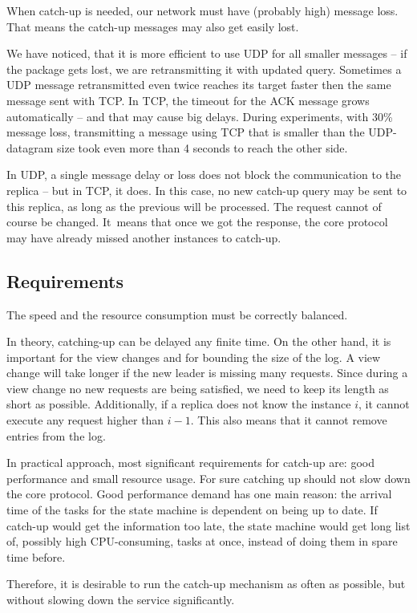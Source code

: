 When catch-up is needed, our network must have (probably high) message loss. That means the catch-up messages may also get easily lost.

We have noticed, that it is more efficient to use UDP for all smaller messages -- if the package gets lost, we are retransmitting it with updated query. Sometimes a UDP message retransmitted even twice reaches its target faster then the same message sent with TCP. In TCP, the timeout for the ACK message grows automatically -- and that may cause big delays. During experiments, with 30\% message loss, transmitting a message using TCP that is smaller than the UDP-datagram size took even more than 4 seconds to reach the other side.

In UDP, a single message delay or loss does not block the communication to the replica -- but in TCP, it does.
In this case, no new catch-up query may be sent to this replica, as long as the previous will be processed. The request cannot of course be changed. It~means that once we got the response, the core protocol may have already missed another instances to catch-up.

\subsection{Requirements}
\label{subsec:catch_up_requirements}
The speed and the resource consumption must be correctly balanced.

In theory, catching-up can be delayed any finite time. On the other hand, it is important for the view changes and for bounding the size of the log. A view change will take longer if the new leader is missing many requests. Since during a view change no new requests are being satisfied, we need to keep its length as short as possible. Additionally, if a replica does not know the instance $i$, it cannot execute any request higher than $i-1$. This also means that it cannot remove entries from the log.

In practical approach, most significant requirements for catch-up are: good performance and small resource usage. For sure catching up should not slow down the core protocol.
Good performance demand has one main reason: the arrival time of the tasks for the state machine is dependent on being up to date. If catch-up would get the information too late, the state machine would get long list of, possibly high CPU-consuming, tasks at once, instead of doing them in spare time before.

Therefore, it is desirable to run the catch-up mechanism as often as possible, but without slowing down the service significantly.

